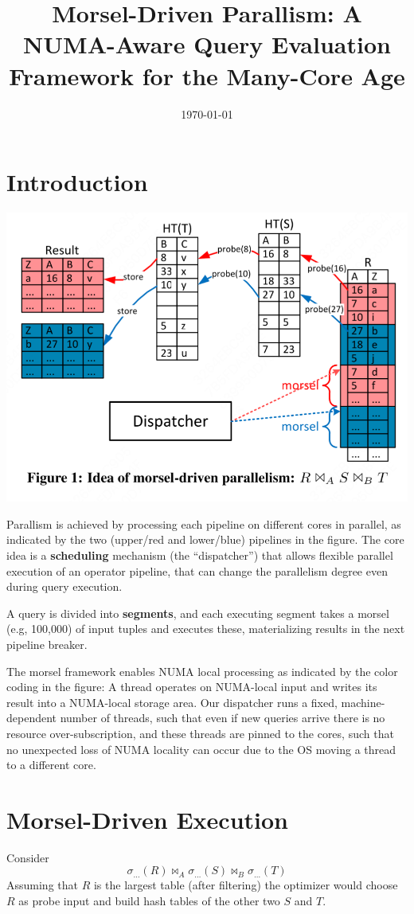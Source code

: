 \documentclass[11pt]{article}
\date{\today}
\title{Morsel-Driven Parallism: A NUMA-Aware Query Evaluation Framework for the Many-Core Age}
\begin{document}
\maketitle
\section{Introduction}
\label{sec:org3038900}
\begin{center}
\includegraphics[width=.8\textwidth]{../../images/papers/63.png}
\end{center}

Parallism is achieved by processing each pipeline on different cores in parallel, as indicated by the
two (upper/red and lower/blue) pipelines in the figure. The core idea is a \textbf{scheduling} mechanism (the
“dispatcher”) that allows flexible parallel execution of an operator pipeline, that can change the
parallelism degree even during query execution.

A query is divided into \textbf{segments}, and each executing segment takes a morsel (e.g, 100,000) of input
tuples and executes these, materializing results in the next pipeline breaker.

The morsel framework enables NUMA local processing as indicated by the color coding in the figure: A
thread operates on NUMA-local input and writes its result into a NUMA-local storage area. Our
dispatcher runs a fixed, machine-dependent number of threads, such that even if new queries arrive
there is no resource over-subscription, and these threads are pinned to the cores, such that no
unexpected loss of NUMA locality can occur due to the OS moving a thread to a different core.
\section{Morsel-Driven Execution}
\label{sec:orgd9eeb79}
Consider
\begin{equation*}
\sigma_{\dots}(R)\bowtie_A\sigma_{\dots}(S)\bowtie_B\sigma_{\dots}(T)
\end{equation*}
Assuming that \(R\) is the largest table (after filtering) the optimizer would choose \(R\) as probe
input and build hash tables of the other two \(S\) and \(T\).
\end{document}
